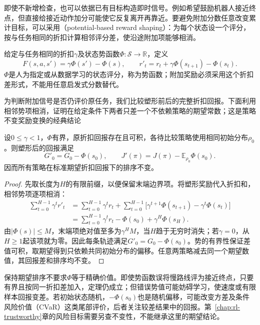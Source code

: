 即使不新增检查，也可以依据已有目标构造即时信号。例如希望鼓励机器人接近终点，但直接给接近动作加分可能使它反复离开再靠近。要避免附加分数任意改变累计目标，可以采用（potential-based reward shaping）：为每个状态设一个评分，按与任务相同的折扣计算相邻评分差，使沿途附加项能够相消。

\begin{definition}[潜势型塑形]
  \label{def:rl-reward-shaping}
  给定与任务相同的折扣$\gamma$及状态势函数$\Phi:\mathcal S\to\mathbb R$，定义
  \[
    F(s,a,s')=\gamma\Phi(s')-\Phi(s),\qquad
    r'_t=r_t+\gamma\Phi(s_{t+1})-\Phi(s_t).
  \]
  $\Phi$是人为指定或从数据学习的状态评分，称为势函数；附加奖励必须采用这个折扣差形式，不能用任意启发式分数替代。
\end{definition}

为判断附加信号是否仍评价原任务，我们比较塑形前后的完整折扣回报。下面利用相邻势项相消，证明在给定条件下两者只差一个不依赖策略的期望常数；这是策略不变奖励变换的经典结论

\begin{theorem}[无限折扣时域的塑形不变性]
  \label{thm:rl-reward-shaping}
  设$0\leq\gamma<1$，$\Phi$有界，原折扣回报存在且可积，各待比较策略使用相同初始分布$\rho_0$。则塑形后的回报满足
  \[
    G'_0=G_0-\Phi(s_0),\qquad
    J'(\pi)=J(\pi)-\mathbb E_{\rho_0}\Phi(s_0).
  \]
  因而所有策略在标准期望折扣回报下的排序不变。
\end{theorem}

\begin{proof}
  先取长度为$H$的有限前缀，以便保留末端边界项。将塑形奖励代入折扣和，相邻势项逐项相消：
  \begin{align*}
    \sum_{t=0}^{H-1}\gamma^t r'_t
    &=\sum_{t=0}^{H-1}\gamma^t r_t
       +\sum_{t=0}^{H-1}
          \bigl[\gamma^{t+1}\Phi(s_{t+1})
                          -\gamma^t\Phi(s_t)\bigr]\\
    &=\sum_{t=0}^{H-1}\gamma^t r_t
       -\Phi(s_0)+\gamma^H\Phi(s_H).
  \end{align*}
  由$|\Phi(s)|\leq M$，末端项绝对值至多为$\gamma^H M$，当$H$趋于无穷时消失；若$\gamma=0$，从$H\geq1$起该项就为零。因此每条轨迹满足$G'_0=G_0-\Phi(s_0)$。势的有界性保证差值可积，取期望得到只依赖共同初始分布的偏移。任意两策略减去同一个期望数值，其回报差和排序均不变。
\end{proof}

保持期望排序不要求$\Phi$等于精确价值。即使势函数误将慢路线评为接近终点，只要有界且按同一折扣差加入，定理仍成立；但错误势值可能妨碍学习，使速度或有限样本回报变差。若初始状态随机，$-\Phi(s_0)$也是随机偏移，可能改变方差及条件风险价值（CVaR）这类尾部评价，后者关注较差结果中的回报。第~\ref{chap:rl-trustworthy}章的风险目标需要另查不变性，不能继承这里的期望结论。

